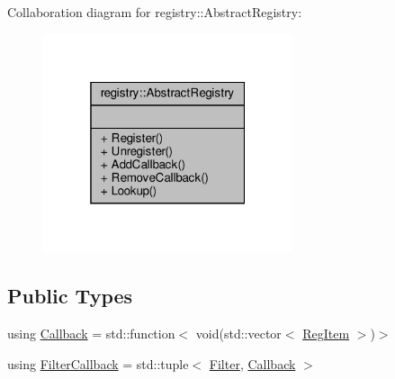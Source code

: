 Collaboration diagram for registry\+:\+:Abstract\+Registry\+:\nopagebreak
\begin{figure}[H]
\begin{center}
\leavevmode
\includegraphics[width=208pt]{classregistry_1_1AbstractRegistry__coll__graph}
\end{center}
\end{figure}
\subsection*{Public Types}
\begin{DoxyCompactItemize}
\item 
using \hyperlink{classregistry_1_1AbstractRegistry_a08a798ca9ca1c4c983ebd2386ca3c315}{Callback} = std\+::function$<$ void(std\+::vector$<$ \hyperlink{classregistry_1_1RegItem}{Reg\+Item} $>$)$>$
\item 
using \hyperlink{classregistry_1_1AbstractRegistry_a31f6bef634dcd324efebaf55f99b950f}{Filter\+Callback} = std\+::tuple$<$ \hyperlink{classregistry_1_1Filter}{Filter}, \hyperlink{classregistry_1_1AbstractRegistry_a08a798ca9ca1c4c983ebd2386ca3c315}{Callback} $>$
\end{DoxyCompactItemize}
